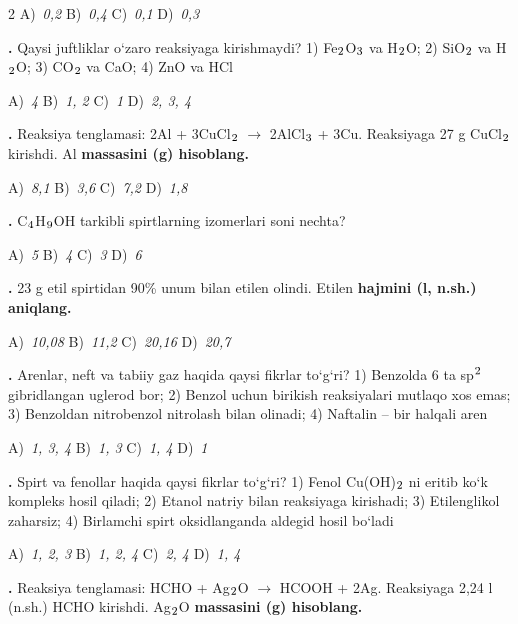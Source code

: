 \documentclass[11pt,a4paper]{article}
\renewcommand{\textsubscript}[1]{\ensuremath{_{\text{\fontsize{8}{8}\selectfont #1}}}}
\renewcommand{\textsuperscript}[1]{\ensuremath{^{\text{\fontsize{8}{8}\selectfont #1}}}}
\newcommand{\qn}[1]{\textbf{\fontsize{11.5}{13}\selectfont #1}}
\newcommand{\qsep}{\par\vspace{1pt}\noindent\rule{0pt}{0.4pt}\par\vspace{5pt}}
\begin{document}
\begin{multicols}{2}
\noindent A)~\textsl{0,2} \hfill B)~\textsl{0,4} \hfill C)~\textsl{0,1} \hfill D)~\textsl{0,3}\par
\qsep
\noindent\qn{18.} Qaysi juftliklar o`zaro reaksiyaga kirishmaydi? 1) Fe\textsubscript{2}O\textsubscript{3} va H\textsubscript{2}O; 2) SiO\textsubscript{2} va H\textsubscript{2}O; 3) CO\textsubscript{2} va CaO; 4) ZnO va HCl

\noindent A)~\textsl{4} \hfill B)~\textsl{1, 2} \hfill C)~\textsl{1} \hfill D)~\textsl{2, 3, 4}\par
\qsep
\noindent\qn{19.} Reaksiya tenglamasi: 2Al + 3CuCl\textsubscript{2} $\to$ 2AlCl\textsubscript{3} + 3Cu. Reaksiyaga 27 g CuCl\textsubscript{2} kirishdi. Al \textbf{massasini (g) hisoblang.}

\noindent A)~\textsl{8,1} \hfill B)~\textsl{3,6} \hfill C)~\textsl{7,2} \hfill D)~\textsl{1,8}\par
\qsep
\noindent\qn{20.} C\textsubscript{4}H\textsubscript{9}OH tarkibli spirtlarning izomerlari soni nechta?

\noindent A)~\textsl{5} \hfill B)~\textsl{4} \hfill C)~\textsl{3} \hfill D)~\textsl{6}\par
\qsep
\noindent\qn{21.} 23 g etil spirtidan 90\% unum bilan etilen olindi. Etilen \textbf{hajmini (l, n.sh.) aniqlang.}

\noindent A)~\textsl{10,08} \hfill B)~\textsl{11,2} \hfill C)~\textsl{20,16} \hfill D)~\textsl{20,7}\par
\qsep
\noindent\qn{22.} Arenlar, neft va tabiiy gaz haqida qaysi fikrlar to`g`ri? 1) Benzolda 6 ta sp\textsuperscript{2} gibridlangan uglerod bor; 2) Benzol uchun birikish reaksiyalari mutlaqo xos emas; 3) Benzoldan nitrobenzol nitrolash bilan olinadi; 4) Naftalin -- bir halqali aren

\noindent A)~\textsl{1, 3, 4} \hfill B)~\textsl{1, 3} \hfill C)~\textsl{1, 4} \hfill D)~\textsl{1}\par
\qsep
\noindent\qn{23.} Spirt va fenollar haqida qaysi fikrlar to`g`ri? 1) Fenol Cu(OH)\textsubscript{2} ni eritib ko`k kompleks hosil qiladi; 2) Etanol natriy bilan reaksiyaga kirishadi; 3) Etilenglikol zaharsiz; 4) Birlamchi spirt oksidlanganda aldegid hosil bo`ladi

\noindent A)~\textsl{1, 2, 3} \hfill B)~\textsl{1, 2, 4} \hfill C)~\textsl{2, 4} \hfill D)~\textsl{1, 4}\par
\qsep
\noindent\qn{24.} Reaksiya tenglamasi: HCHO + Ag\textsubscript{2}O $\to$ HCOOH + 2Ag. Reaksiyaga 2,24 l (n.sh.) HCHO kirishdi. Ag\textsubscript{2}O \textbf{massasini (g) hisoblang.}


\end{multicols}
\end{document}
